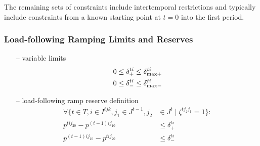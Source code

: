 \documentclass[12pt]{article}
\numberwithin{equation}{section}
\numberwithin{table}{section}
\numberwithin{figure}{section}
\begin{document}

The remaining sets of constraints include intertemporal restrictions and typically include constraints from a known starting point at $t=0$ into the first period.

\subsubsection*{Load-following Ramping Limits and Reserves}
\begin{itemize}
\item[--]  variable limits
\begin{align}
0 \leq \delta_+^{ti} &\leq  \delta^{ti}_{\rm max+} \label{eq:deltapbounds} \\
0 \leq \delta_-^{ti} &\leq  \delta^{ti}_{\rm max-}  \label{eq:deltambounds}
\end{align}
\item[--] load-following ramp reserve definition
\begin{align}
\forall \{t \in T, i \in I^{tjk}, j_1 \in J^{t-1}, j_2 &\in J^t \mid \zeta^{tj_2j_1} = 1 \}: \label{eq:rampconstrdef} \\
p^{tij_20} - p^{(t-1)ij_10} &\leq \delta_+^{ti} \label{eq:inter1} \\
p^{(t-1)ij_10} - p^{tij_20} &\leq \delta_-^{ti} \label{eq:rampconstr}
\end{align}
\end{itemize}
\end{document}
